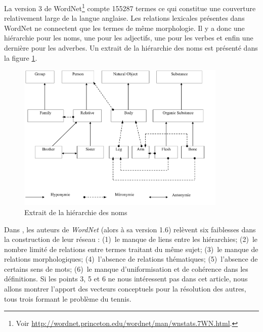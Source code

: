 {La version 3 de WordNet\footnote{Voir \url {http://wordnet.princeton.edu/wordnet/man/wnstats.7WN.html}.} compte 155287 termes ce qui constitue une
couverture relativement large de la langue anglaise. Les relations
lexicales présentes dans WordNet ne connectent que les termes de même
morphologie. %
Il y a donc une hiérarchie
pour les noms, une pour les adjectifs, une pour les verbes et enfin
une dernière pour les adverbes. Un extrait de la hiérarchie des noms
est présenté dans la figure \ref{fig:wordnet}.

\begin{figure}[htbp]
  \centering \includegraphics[width = 10cm]{2_Etat-art/img/wordnet}

  \caption{Extrait de la hiérarchie des noms}\label{fig:wordnet}
\end{figure}

Dans \cite{Harabagiu1999}, les auteurs de \emph{WordNet} (alors à sa
version 1.6) relèvent six faiblesses dans la construction de leur
réseau : (1)~le manque de liens entre les hiérarchies; (2)~le nombre
limité de relations entre termes traitant du même sujet; (3)~le manque
de relations morphologiques; (4)~l'absence de relations thématiques;
(5)~l'absence de certains sens de mots; (6)~le manque d'uniformisation
et de cohérence dans les définitions.  Si les points 3, 5 et 6 ne nous
intéressent pas dans cet article, nous allons montrer l'apport des
vecteurs conceptuels pour la résolution des autres, tous trois formant
le problème du tennis.



}
